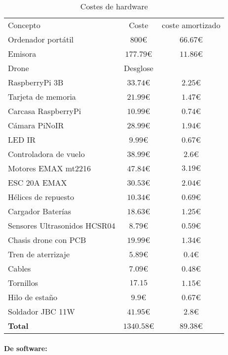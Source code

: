 \begin{table}[H]
	\begin{center}
		\begin{tabular}{l | c | c}\hline
			\toprule
			Concepto & Coste & coste amortizado\\
			\otoprule
			Ordenador portátil & $800 $\euro & $66.67 $\euro\\
			Emisora & $177.79 $\euro & $11.86 $\euro\\
			Drone & Desglose & \\
			RaspberryPi 3B & $33.74 $\euro & $2.25 $\euro\\
			Tarjeta de memoria & $21.99 $\euro & $1.47 $\euro\\
			Carcasa RaspberryPi & $10.99 $\euro & $0.74 $\euro\\
			Cámara PiNoIR & $28.99 $\euro & $1.94 $\euro\\
			LED IR & $9.99 $\euro & $0.67 $\euro\\
			Controladora de vuelo & $38.99 $\euro & $2.6 $\euro\\
			Motores EMAX mt2216 & $47.84 $\euro &$3.19 \euro $\\
			ESC 20A EMAX & $30.53$\euro & $2.04 $\euro\\
			Hélices de repuesto & $10.34 $\euro & $0.69 $\euro\\
			Cargador Baterías & $18.63 $\euro & $1.25$\euro\\
			Sensores Ultrasonidos HCSR04 & $8.79$\euro & $0.59$\euro\\
			Chasis drone con PCB & $19.99 $\euro & $1.34 $\euro\\
			Tren de aterrizaje & $5.89 $\euro & $0.4$\euro\\
			Cables & $7.09$\euro & $0.48$\euro\\
			Tornillos & $17.15$ & $1.15$\euro\\
			Hilo de estaño & $9.9$\euro & $0.67$\euro\\
			Soldador JBC 11W & $41.95$\euro & $2.8$\euro\\
			\hline
			\textbf{Total} & $1340.58 $\euro & $89.38$\euro\\
			\bottomrule
		\end{tabular}
		\caption{Costes de hardware}
		\label{tb:costesHardware}
	\end{center}
\end{table}


\paragraph{De software:}

